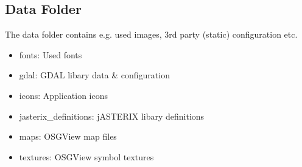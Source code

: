 \begin{itemize}
\end{itemize}

\subsection{Data Folder}
\label{sec:appendix_config_data_folder}

The data folder contains e.g. used images, 3rd party (static) configuration etc.

\begin{itemize}
\item fonts: Used fonts
\item gdal: GDAL libary data \& configuration
\item icons: Application icons
\item jasterix\_definitions: jASTERIX libary definitions
\item maps: OSGView map files
\item textures: OSGView symbol textures
\end{itemize}

